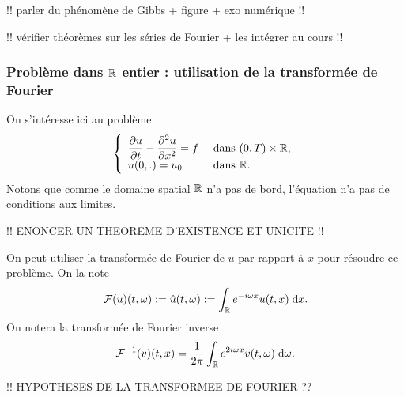 \documentclass[12pt,a4paper,twoside]{article}
\begin{document}
!! parler du ph\'enom\`ene de Gibbs + figure + exo num\'erique !!

!! v\'erifier th\'eor\`emes sur les s\'eries de Fourier
+ les int\'egrer au cours !!




\subsubsection{Probl\`eme dans $\mathbb{R}$ entier : 
  utilisation de la transform\'ee de Fourier}


On s'int\'eresse ici au probl\`eme
\begin{equation}
  \label{eq:chaleur_R}
  \left\{
    \begin{array}{l l}
      \dfrac{\partial u}{\partial t} - \dfrac{\partial^2 u}{\partial x^2} = f 
      &\text{ dans } (0,T) \times \mathbb{R} ,
      \\
      u(0,.) = u_0 
      & \text{ dans } \mathbb{R} .
    \end{array}
  \right.
\end{equation}
Notons que comme le domaine spatial $\mathbb{R}$ n'a pas de bord, l'\'equation 
n'a pas de conditions aux limites.


!! ENONCER UN THEOREME D'EXISTENCE ET UNICITE !!


On peut utiliser la transform\'ee de Fourier de $u$ par rapport \`a $x$ 
pour r\'esoudre ce probl\`eme. On la note
\begin{align*}
  \mathcal{F}(u)(t,\omega) := \hat u(t,\omega) := \int_{\mathbb{R}} e^{- i \omega x} u(t,x) \;\mathrm{d} x .
\end{align*}
On notera la transform\'ee de Fourier inverse
\begin{align*}
  \mathcal{F}^{-1}(v)(t,x) = \dfrac{1}{2\pi} \int_{\mathbb{R}} e^{2 i \omega x} v(t,\omega) \;\mathrm{d} \omega .
\end{align*}


!! HYPOTHESES DE LA TRANSFORMEE DE FOURIER ??
\end{document}
